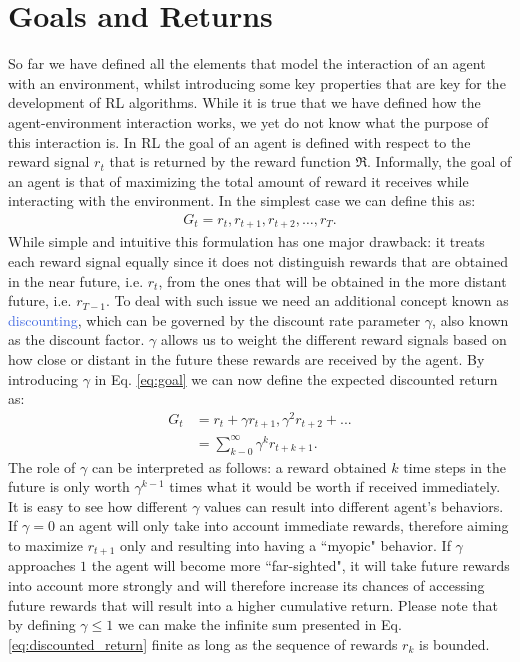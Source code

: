 \section{Goals and Returns}
So far we have defined all the elements that model the interaction of an agent with an environment, whilst introducing some key properties that are key for the development of RL algorithms. While it is true that we have defined how the agent-environment interaction works, we yet do not know what the purpose of this interaction is. In RL the goal of an agent is defined with respect to the reward signal $r_t$ that is returned by the reward function $\Re$. Informally, the goal of an agent is that of maximizing the total amount of reward it receives while interacting with the environment. In the simplest case we can define this as:
\begin{align}
	G_t = r_t, r_{t+1}, r_{t+2}, \ldots, r_{T}.
\label{eq:goal}
\end{align}
While simple and intuitive this formulation has one major drawback: it treats each reward signal equally since it does not distinguish rewards that are obtained in the near future, i.e. $r_t$, from the ones that will be obtained in the more distant future, i.e. $r_{T-1}$. To deal with such issue we need an additional concept known as \textcolor{RoyalBlue}{discounting}, which can be governed by the discount rate parameter $\gamma$, also known as the discount factor. $\gamma$ allows us to weight the different reward signals based on how close or distant in the future these rewards are received by the agent. By introducing $\gamma$ in Eq. \ref{eq:goal} we can now define the expected discounted return as:
\begin{align}
	G_t & = r_t+\gamma r_{t+1}, \gamma^{2} r_{t+2} + ... \\
	    & = \sum_{k-0}^{\infty}\gamma^{k} r_{t+k+1}.
\label{eq:discounted_return}
\end{align}
The role of $\gamma$ can be interpreted as follows: a reward obtained $k$ time steps in the future is only worth $\gamma^{k-1}$ times what it would be worth if received immediately. It is easy to see how different $\gamma$ values can result into different agent's behaviors. If $\gamma=0$ an agent will only take into account immediate rewards, therefore aiming to maximize $r_{t+1}$ only and resulting into having a ``myopic" behavior. If $\gamma$ approaches $1$ the agent will become more ``far-sighted", it will take future rewards into account more strongly and will therefore increase its chances of accessing future rewards that will result into a higher cumulative return. 
Please note that by defining $\gamma \leq 1$ we can make the infinite sum presented in Eq. \ref{eq:discounted_return} finite as long as the sequence of rewards $r_k$ is bounded.   

